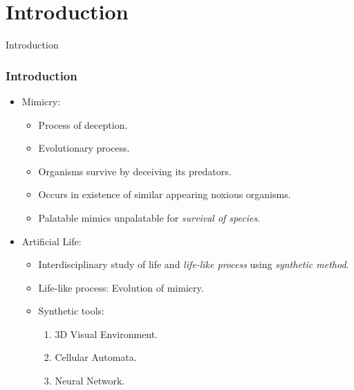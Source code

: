 \section{Introduction}

\frame
{
	\begin{center}
		\LARGE Introduction
	\end{center}
}

\frame
{
	\frametitle{Introduction}
	
	\begin{itemize}
		\item Mimicry:
			\begin{itemize}
				\item Process of deception.
				\item Evolutionary process.
				\item Organisms survive by deceiving its predators.
				\item Occurs in existence of similar appearing noxious organisms.
				\item Palatable mimics unpalatable for \textit{survival of species}.
			\end{itemize}
		\item Artificial Life:
			\begin{itemize}
				\item Interdisciplinary study of life and \textit{life-like process} using \textit{synthetic method}.
				\item Life-like process: Evolution of mimicry.
				\item Synthetic tools:
					\begin{enumerate}
						\item 3D Visual Environment.
						\item Cellular Automata.
						\item Neural Network.
					\end{enumerate}
			\end{itemize}
	\end{itemize}
}
